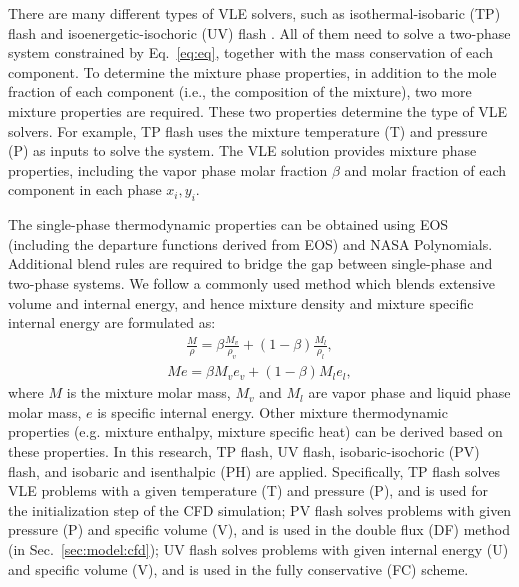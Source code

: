 There are many different types of VLE solvers, such as isothermal-isobaric (TP) flash \cite{michelsen1982isothermal} and isoenergetic-isochoric (UV) flash \cite{saha1997isoenergetic}. All of them need to solve a two-phase system constrained by Eq.~\ref{eq:eq}, together with the mass conservation of each component. To determine the mixture phase properties, in addition to the mole fraction of each component (i.e., the composition of the mixture), two more mixture properties are required. These two properties determine the type of VLE solvers. For example, TP flash uses the mixture temperature (T) and pressure (P) as inputs to solve the system. The VLE solution provides mixture phase properties, including the vapor phase molar fraction $\beta$ and molar fraction of each component in each phase $x_i,y_i$. 

The single-phase thermodynamic properties can be obtained using EOS (including the departure functions derived from EOS) and NASA Polynomials. Additional blend rules are required to bridge the gap between single-phase and two-phase systems. We follow a commonly used method which blends \cite{matheis2018multi,tudisco2020numerical} extensive volume and internal energy, and hence mixture density and mixture specific internal energy are formulated as:
\begin{align} \frac{M}{\rho} = \beta \frac{M_v}{\rho_v}+\left(1-\beta\right)\frac{M_l}{\rho_l}, \label{eq:rho}
\end{align}
\begin{align} Me = \beta M_v e_v + \left(1-\beta\right)M_l e_l, \label{eq:e}
\end{align}
where $M$ is the mixture molar mass, $M_v$ and $M_l$ are vapor phase and liquid phase molar mass, $e$ is specific internal energy. 
Other mixture thermodynamic properties (e.g. mixture enthalpy, mixture specific heat) can be derived based on these properties. 
In this research, TP flash, UV flash, isobaric-isochoric (PV) flash, and isobaric and isenthalpic (PH) are applied. Specifically, 
TP flash solves VLE problems with a given temperature (T) and pressure (P), and is used for the initialization step of the CFD simulation; PV flash solves problems with given pressure (P) and specific volume (V), and is used in the double flux (DF) method (in Sec.~\ref{sec:model:cfd}); UV flash solves problems with given internal energy (U) and specific volume (V), and is used in the fully conservative (FC) scheme. 


